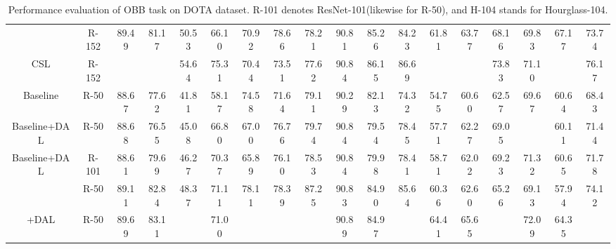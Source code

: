 \documentclass[letterpaper]{article} \usepackage{aaai21}  \usepackage{times}  \usepackage{helvet} \usepackage{courier}  \usepackage[hyphens]{url}  \usepackage{graphicx} \urlstyle{rm} \def\UrlFont{\rm}  \usepackage{natbib}  \usepackage{caption} \frenchspacing  \setlength{\pdfpagewidth}{8.5in}  \setlength{\pdfpageheight}{11in}  \usepackage{url}
\begin{document}
\begin{table*}[t]
{\begin{tabular}{c|c|ccccccccccccccc|c}
		\cite{yang2019r3det}   &  R-152        & 89.49  &81.17  &50.53  &66.10   &70.92  &78.66  &78.21  &90.81  &85.26  &84.23  &61.81  &63.77  &68.16  &69.83  &67.17  &73.74 \\ 
		CSL\cite{yang2020arbitrary}   &  R-152    &  & &54.64  &75.31   &70.44  &73.51  &77.62  &90.84  &86.15  &86.69  &  &  &73.83  &71.10  & &76.17 \\ 
		\midrule
		Baseline                        &  R-50         &88.67 	&77.62   &41.81  &58.17   &74.58  &71.64  &79.11  &90.29  &82.13  &74.32  &54.75  &60.60  &62.57  &69.67  &60.64  &68.43 \\ 
		Baseline+DAL                    &  R-50         &88.68 	&76.55   &45.08  &66.80   &67.00  &76.76  &79.74  &90.84  &79.54  &78.45  &57.71  &62.27  &69.05  &  &60.11  &71.44 \\ 
        Baseline+DAL                    &  R-101         &88.61 	&79.69	&46.27	&70.37 	&65.89 	&76.10	&78.53	&90.84	&79.98	&78.41	&58.71	&62.02	&69.23	&71.32	&60.65 &71.78\\
		\cite{han2020align}      &  R-50         &89.11  &82.84   &48.37  &71.11   &78.11  &78.39  &87.25  &90.83  &84.90  &85.64  &60.36  &62.60  &65.26  &69.13  &57.94  &74.12 \\ 
		+DAL                     &  R-50         &89.69  &83.11  	 &  &71.00   &  &  &  &90.89  &84.97  &  &64.41  &65.65  &  &72.09  &64.35  &  \\ 
		\bottomrule
	\end{tabular}}
\caption{  Performance evaluation of OBB task on DOTA dataset. R-101 denotes ResNet-101(likewise for R-50), and H-104 stands for Hourglass-104.}
\label{table4}
\end{table*}           
    
\end{document}
